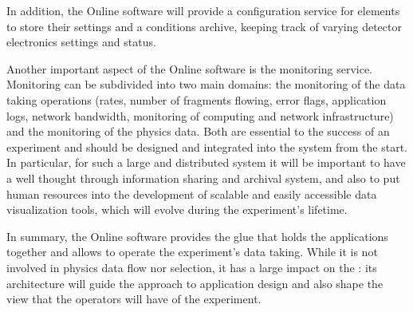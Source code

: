 In addition, the Online software will provide a configuration service
for  elements to store their settings and a conditions
archive, keeping track of varying detector electronics settings and
status.

Another important aspect of the Online software is the monitoring
service.
Monitoring can be subdivided into two main domains: the monitoring of
the data taking operations (rates, number of fragments flowing, error
flags, application logs, network bandwidth, monitoring of computing
and network infrastructure) and the monitoring of the physics data.
Both are essential to the success of an experiment and should be
designed and integrated into the  system from the start.
In particular, for such a large and distributed system it will be
important to have a well thought through information sharing and
archival system, and also to put human resources into the development
of scalable and easily accessible data visualization tools, which will
evolve during the experiment’s lifetime.

In summary, the Online software provides the glue that holds the
 applications together and allows to operate the
experiment’s data taking.
While it is not involved in physics data flow nor selection, it has a
large impact on the : its architecture will guide the
approach to  application design and also shape the view
that the operators will have of the experiment.

